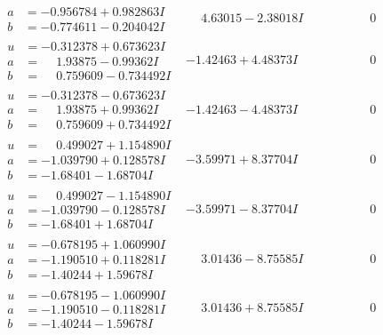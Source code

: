 \documentclass[1p]{elsarticle_modified}
\theoremstyle{definition}
\begin{document}
$$\begin{array}{c|c|c}
\begin{aligned}
a &= -0.956784 + 0.982863 I \\
b &= -0.774611 - 0.204042 I\end{aligned}
 & \phantom{-}4.63015 - 2.38018 I & \phantom{-0.000000 } 0 \\ \hline\begin{aligned}
u &= -0.312378 + 0.673623 I \\
a &= \phantom{-}1.93875 - 0.99362 I \\
b &= \phantom{-}0.759609 - 0.734492 I\end{aligned}
 & -1.42463 + 4.48373 I & \phantom{-0.000000 } 0 \\ \hline\begin{aligned}
u &= -0.312378 - 0.673623 I \\
a &= \phantom{-}1.93875 + 0.99362 I \\
b &= \phantom{-}0.759609 + 0.734492 I\end{aligned}
 & -1.42463 - 4.48373 I & \phantom{-0.000000 } 0 \\ \hline\begin{aligned}
u &= \phantom{-}0.499027 + 1.154890 I \\
a &= -1.039790 + 0.128578 I \\
b &= -1.68401 - 1.68704 I\end{aligned}
 & -3.59971 + 8.37704 I & \phantom{-0.000000 } 0 \\ \hline\begin{aligned}
u &= \phantom{-}0.499027 - 1.154890 I \\
a &= -1.039790 - 0.128578 I \\
b &= -1.68401 + 1.68704 I\end{aligned}
 & -3.59971 - 8.37704 I & \phantom{-0.000000 } 0 \\ \hline\begin{aligned}
u &= -0.678195 + 1.060990 I \\
a &= -1.190510 + 0.118281 I \\
b &= -1.40244 + 1.59678 I\end{aligned}
 & \phantom{-}3.01436 - 8.75585 I & \phantom{-0.000000 } 0 \\ \hline\begin{aligned}
u &= -0.678195 - 1.060990 I \\
a &= -1.190510 - 0.118281 I \\
b &= -1.40244 - 1.59678 I\end{aligned}
 & \phantom{-}3.01436 + 8.75585 I & \phantom{-0.000000 } 0 \\ \hline\begin{aligned}

\end{aligned}
\end{array}$$
\end{document}
